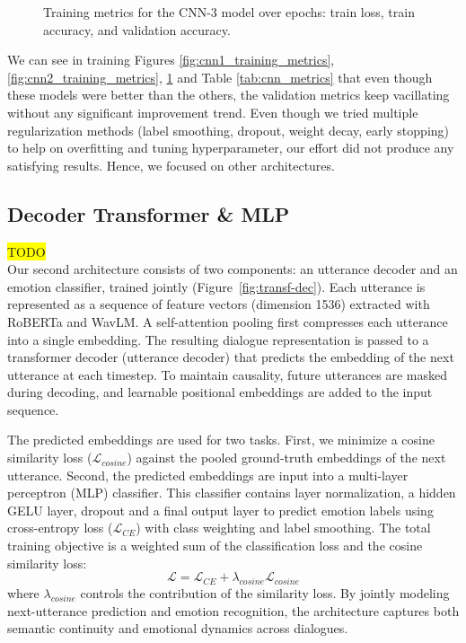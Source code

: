 \documentclass{article}
\begin{document}
\begin{figure}[t]
    \caption{Training metrics for the CNN-3 model over epochs: train loss, train accuracy, and validation accuracy.}
    \label{fig:cnn3_training_metrics}
\end{figure}


We can see in training Figures \ref{fig:cnn1_training_metrics}, \ref{fig:cnn2_training_metrics}, \ref{fig:cnn3_training_metrics} and Table \ref{tab:cnn_metrics} that even though these models were better than the others, the validation metrics keep vacillating without any significant improvement trend.
Even though we tried multiple regularization methods (label smoothing, dropout, weight decay, early stopping) to help on overfitting and tuning hyperparameter, our effort did not produce any satisfying results. Hence, we focused on other architectures.

\subsection{Decoder Transformer \& MLP}
\colorbox{yellow}{TODO}\\
Our second architecture consists of two components: an utterance decoder and an emotion classifier, trained jointly (Figure~\ref{fig:transf-dec}). Each utterance is represented as a sequence of feature vectors (dimension 1536) extracted with RoBERTa and WavLM. A self-attention pooling first compresses each utterance into a single embedding. The resulting dialogue representation is passed to a transformer decoder (utterance decoder) that predicts the embedding of the next utterance at each timestep. To maintain causality, future utterances are masked during decoding, and learnable positional embeddings are added to the input sequence.

The predicted embeddings are used for two tasks. First, we minimize a cosine similarity loss ($\mathcal{L}_{cosine}$) against the pooled ground-truth embeddings of the next utterance. Second, the predicted embeddings are input into a multi-layer perceptron (MLP) classifier. This classifier contains layer normalization, a hidden GELU layer, dropout and a final output layer to predict emotion labels using cross-entropy loss ($\mathcal{L}_{CE}$) with class weighting and label smoothing. The total training objective is a weighted sum of the classification loss and the cosine similarity loss:
\[
\mathcal{L}=\mathcal{L}_{CE}+ \lambda_{cosine} \mathcal{L}_{cosine}
\]
where $\lambda_{cosine}$ controls the contribution of the similarity loss. By jointly modeling next-utterance prediction and emotion recognition, the architecture captures both semantic continuity and emotional dynamics across dialogues. 
\end{document}
